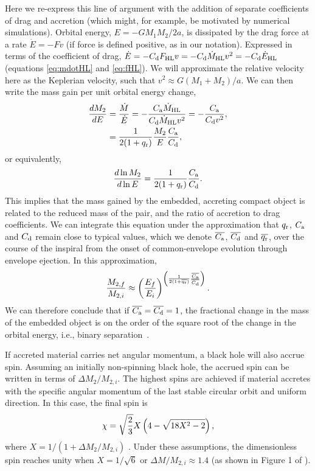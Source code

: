 Here we re-express this line of argument with the addition of separate coefficients of drag and accretion (which might, for example, be motivated by numerical simulations). Orbital energy, $E = -GM_1 M_2 / 2 a$, is dissipated by the drag force at a rate $\dot E = - F v$ (if force is defined positive, as in our notation). Expressed in terms of the coefficient of drag, $\dot E = - C_{\rm d} F_{\rm HL} v = - C_{\rm d} \dot M_{\rm HL} v^2 = - C_{\rm d} \dot E_{\rm HL}$ (equations \eqref{eq:mdotHL} and \eqref{eq:fHL}). We will approximate the relative velocity here as the Keplerian velocity, such that $v^2 \approx G(M_1 + M_2)/a$. We can then write the mass gain per unit orbital energy change,
\begin{align}
\frac{dM_2}{dE} &=\frac{\dot M}{\dot E} = - \frac{C_{\rm a} \dot M_{\rm HL} }{C_{\rm d} \dot M_{\rm HL} v^2} = - \frac{C_{\rm a}  }{C_{\rm d}  v^2}, \nonumber \\
& = \frac{1}{2(1+q_{\rm r})} \frac{M_2}{E} \frac{C_{\rm a}  }{C_{\rm d} },
\end{align}
or equivalently, 
\begin{equation}\label{eq:dlnMdE}
 \frac{d \ln M_2}{d \ln E}   = \frac{1}{2(1+q_{\rm r})} \frac{C_{\rm a}  }{C_{\rm d} }.
\end{equation}
This implies that the mass gained by the embedded, accreting compact object is related to the reduced mass of the pair, and the ratio of accretion to drag coefficients. 
We can integrate this equation under the approximation that $q_{\rm r}$, $C_{\rm a}$ and $C_{\rm d}$ remain close to typical values, which we denote $\overline{C_{\rm a}}$, $\overline{C_{\rm d}}$ and $\overline{q_{\rm r}}$, over the course of the inspiral from the onset of common-envelope evolution through envelope ejection.  In this approximation,
\begin{equation}\label{eq:MEsolution}
\frac{M_{2,f}}{M_{2,i}} \approx \left(\frac{E_f}{E_i}\right)^ {\left(\frac{1}{2(1 +\overline{q_{\rm r}})} \frac{\overline{C_{\rm a}}}{\overline{C_{\rm d}}}\right)}.
\end{equation}
We can therefore conclude that if $\overline{C_{\rm a}}=\overline{C_{\rm d}}=1$, the fractional change in the mass of the embedded object is on the order of the square root of the change in the orbital energy, i.e., binary separation~\cite{Chevalier:1993,Brown:1995,Bethe:1998}. 

If accreted material carries net angular momentum, a black hole will also accrue spin. Assuming an initially non-spinning black hole, the accrued spin can be written in terms of $\Delta M_2 / M_{2,i}$. The highest spins are achieved if material accretes with the specific angular momentum of the last stable circular orbit and uniform direction. In this case, the final spin is 
\begin{equation}\label{eq:aspin}
    \chi = \sqrt{2 \over 3} X \left( 4 - \sqrt{18 X^2 - 2} \right),
\end{equation}
where $X=1/(1 + \Delta M_2 / M_{2,i})$  \cite{kingkolb:1999}.
Under these assumptions, the dimensionless spin reaches unity when $X = 1/\sqrt{6}$ or $\Delta M / M_{2,i}\approx 1.4$ (as shown in Figure 1 of \cite{kingkolb:1999}). 

